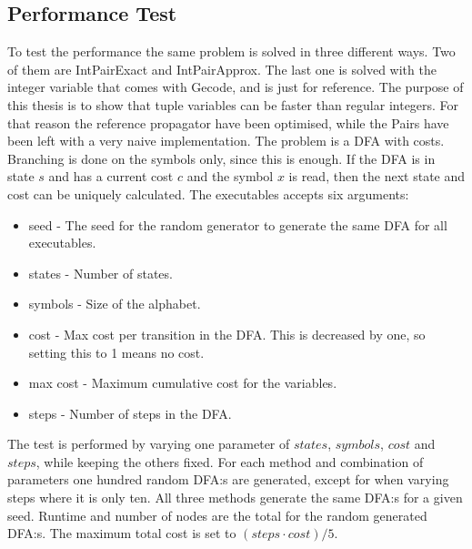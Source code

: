 \documentclass[a4paper,11pt]{article}
\begin{document}
\subsection{Performance Test}
\label{sec:performancetest}
To test the performance the same problem is solved in three different ways. Two of them are IntPairExact and IntPairApprox. The last one is solved with the integer variable that comes with Gecode, and is just for reference. The purpose of this thesis is to show that tuple variables can be faster than regular integers. For that reason the reference propagator have been optimised, while the Pairs have been left with a very naive implementation. The problem is a DFA with costs. Branching is done on the symbols only, since this is enough. If the DFA is in state $s$ and has a current cost $c$ and the symbol $x$ is read, then the next state and cost can be uniquely calculated. The executables accepts six arguments: 
\begin{itemize}
\item{seed} - The seed for the random generator to generate the same DFA for all executables.
\item{states} - Number of states.
\item{symbols} - Size of the alphabet.
\item{cost} - Max cost per transition in the DFA. This is decreased by one, so setting this to 1 means no cost.
\item{max cost} - Maximum cumulative cost for the variables.
\item{steps} - Number of steps in the DFA.
\end{itemize}
The test is performed by varying one parameter of $states$, $symbols$, $cost$ and $steps$, while keeping the others fixed. For each method and combination of parameters one hundred random DFA:s are generated, except for when varying steps where it is only ten. All three methods generate the same DFA:s for a given seed. Runtime and number of nodes are the total for the random generated DFA:s. The maximum total cost is set to $(steps\cdot cost)/5$.






%
\end{document}
